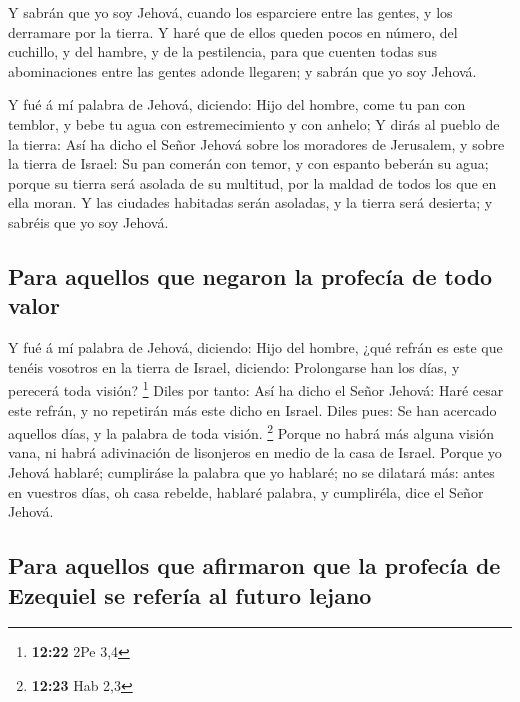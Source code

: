  Y sabrán que yo soy Jehová, cuando los esparciere entre
las gentes, y los derramare por la tierra.  Y haré que de
ellos queden pocos en número, del cuchillo, y del hambre, y de la
pestilencia, para que cuenten todas sus abominaciones entre las gentes
adonde llegaren; y sabrán que yo soy Jehová.

 Y fué á mí palabra de Jehová, diciendo:  Hijo
del hombre, come tu pan con temblor, y bebe tu agua con estremecimiento
y con anhelo;  Y dirás al pueblo de la tierra: Así ha dicho
el Señor Jehová sobre los moradores de Jerusalem, y sobre la tierra de
Israel: Su pan comerán con temor, y con espanto beberán su agua; porque
su tierra será asolada de su multitud, por la maldad de todos los que en
ella moran.  Y las ciudades habitadas serán asoladas, y la
tierra será desierta; y sabréis que yo soy Jehová.

\hypertarget{para-aquellos-que-negaron-la-profecuxeda-de-todo-valor}{%
\subsection{Para aquellos que negaron la profecía de todo
valor}\label{para-aquellos-que-negaron-la-profecuxeda-de-todo-valor}}

 Y fué á mí palabra de Jehová, diciendo:  Hijo
del hombre, ¿qué refrán es este que tenéis vosotros en la tierra de
Israel, diciendo: Prolongarse han los días, y perecerá toda visión?
\footnote{\textbf{12:22} 2Pe 3,4}  Diles por tanto: Así ha
dicho el Señor Jehová: Haré cesar este refrán, y no repetirán más este
dicho en Israel. Diles pues: Se han acercado aquellos días, y la palabra
de toda visión. \footnote{\textbf{12:23} Hab 2,3}  Porque
no habrá más alguna visión vana, ni habrá adivinación de lisonjeros en
medio de la casa de Israel.  Porque yo Jehová hablaré;
cumpliráse la palabra que yo hablaré; no se dilatará más: antes en
vuestros días, oh casa rebelde, hablaré palabra, y cumpliréla, dice el
Señor Jehová.

\hypertarget{para-aquellos-que-afirmaron-que-la-profecuxeda-de-ezequiel-se-referuxeda-al-futuro-lejano}{%
\subsection{Para aquellos que afirmaron que la profecía de Ezequiel se
refería al futuro
lejano}\label{para-aquellos-que-afirmaron-que-la-profecuxeda-de-ezequiel-se-referuxeda-al-futuro-lejano}}

